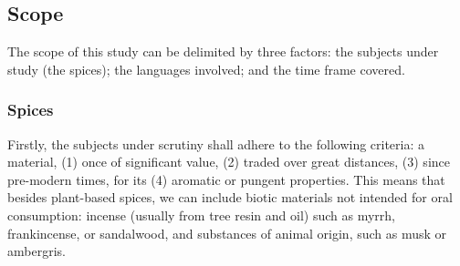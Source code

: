 \subsection{Scope}

The scope of this study can be delimited by three factors: the subjects under study (the spices); the languages involved; and the time frame covered.

\subsubsection{Spices}

Firstly, the subjects under scrutiny shall adhere to the following criteria: a material, (1) once of significant value, (2) traded over great distances, (3) since pre-modern times, for its (4) aromatic or pungent properties. This means that besides plant-based spices, we can include biotic materials not intended for oral consumption: incense (usually from tree resin and oil) such as myrrh, frankincense, or sandalwood, and substances of animal origin, such as musk or ambergris.
